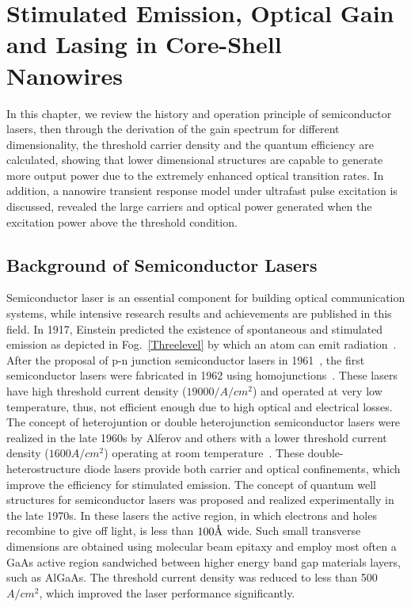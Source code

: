 \chapter[Gain and Lasing]{Stimulated Emission, Optical Gain and Lasing in Core-Shell Nanowires} \label{LT}

In this chapter, we review the history and operation principle of semiconductor
lasers, then through the derivation of the gain spectrum for different
dimensionality, the threshold carrier density and the quantum efficiency are
calculated, showing that lower dimensional structures are capable to generate
more output power due to the extremely enhanced optical transition rates. In
addition, a nanowire transient response model under ultrafast pulse excitation
is discussed, revealed the large carriers and optical power generated when
the excitation power above the threshold condition.

\section{Background of Semiconductor Lasers} \label{SLhistory} 

Semiconductor laser is an essential component for building optical
communication systems, while intensive research results and achievements are
published in this field. In 1917, Einstein predicted the existence of
spontaneous and stimulated emission as depicted in Fog.~\ref{Threelevel} by
which an atom can emit radiation~\cite{einstein1917quantum}. After the proposal
of p-n junction semiconductor lasers in 1961~\cite{basov1961generation}, the
first semiconductor lasers were fabricated in 1962 using
homojunctions~\cite{hall1962coherent}. These lasers have high threshold current
density ($19000/A/{cm}^2$) and operated at very low temperature, thus, not
efficient enough due to high optical and electrical losses. The concept of
heterojuntion or double heterojunction semiconductor lasers were realized in
the late 1960s by Alferov and others with a lower threshold current density
($1600 A/{cm}^2$) operating at room temperature~\cite{alferov1970alas}. These
double-heterostructure diode lasers provide both carrier and optical
confinements, which improve the efficiency for stimulated emission. The concept
of quantum well structures for semiconductor lasers was proposed and realized
experimentally in the late 1970s. In these lasers the active region, in which
electrons and holes recombine to give off light, is less than
$100\text{\normalfont\AA}$ wide. Such small transverse dimensions are obtained
using molecular beam epitaxy and employ most often a GaAs active region
sandwiched between higher energy band gap materials layers, such as AlGaAs. The
threshold current density was reduced to less than 500 $A/{cm}^2$, which
improved the laser performance significantly.

